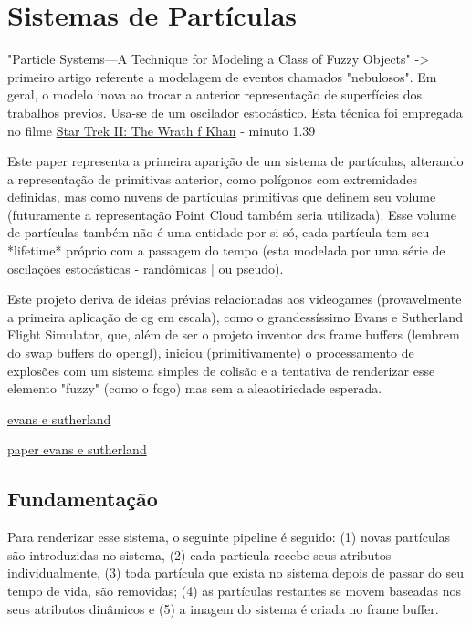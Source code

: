 \section{Sistemas de Partículas}

"Particle Systems—A Technique for Modeling a Class of Fuzzy Objects" -> primeiro artigo referente a modelagem de eventos chamados "nebulosos". Em geral, o modelo inova ao trocar a anterior representação de superfícies dos trabalhos previos. Usa-se de um oscilador estocástico. Esta técnica foi empregada no filme \href{https://www.youtube.com/watch?v=x8X44NRltMM}{Star Trek II: The Wrath f Khan} - minuto 1.39

Este paper representa a primeira aparição de um sistema de partículas, alterando a representação de primitivas anterior, como polígonos com extremidades definidas, mas como nuvens de partículas primitivas que definem seu volume (futuramente a representação Point Cloud também seria utilizada). Esse volume de partículas também não é uma entidade por si só, cada partícula tem seu *lifetime* próprio com a passagem do tempo (esta modelada por uma série de oscilações estocásticas - randômicas | ou pseudo). 

Este projeto deriva de ideias prévias relacionadas aos videogames (provavelmente a primeira aplicação de cg em escala), como o grandessíssimo Evans e Sutherland Flight Simulator, que, além de ser o projeto inventor dos frame buffers (lembrem do swap buffers do opengl), iniciou (primitivamente) o processamento de explosões com um sistema simples de colisão e a tentativa de renderizar esse elemento "fuzzy" (como o fogo) mas sem a aleaotiriedade esperada.

\href{https://www.youtube.com/watch?v=iMpQuclk2vg}{evans e sutherland}

\href{https://s3data.computerhistory.org/brochures/evanssutherland.3d.1974.102646288.pdf}{paper evans e sutherland}

\subsection{Fundamentação}
Para renderizar esse sistema, o seguinte pipeline é seguido: (1) novas partículas são introduzidas no sistema, (2) cada partícula recebe seus atributos individualmente, (3) toda partícula que exista no sistema depois de passar do seu tempo de vida, são removidas; (4) as partículas restantes se movem baseadas nos seus atributos dinâmicos e (5) a imagem do sistema é criada no frame buffer.

